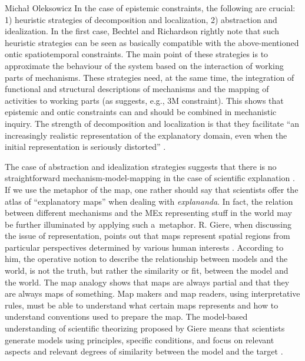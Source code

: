 \begin{artengenv}{Michał Oleksowicz}
In the case of epistemic constraints, the following are crucial: 1) heuristic strategies of decomposition and localization, 2) abstraction and idealization. In the first case, Bechtel and Richardson
\parencite*[][]{bechtel_discovering_2010} %
 rightly note that such heuristic strategies can be seen as basically compatible with the above-mentioned ontic spatiotemporal constraints. The main point of these strategies is to approximate the behaviour of the system based on the interaction of working parts of mechanisms. These strategies need, at the same time, the integration of functional and structural descriptions of mechanisms and the mapping of activities to working parts (as suggests, e.g., 3M constraint). This shows that epistemic and ontic constraints can and should be combined in mechanistic inquiry. The strength of decomposition and localization is that they facilitate ``an increasingly realistic representation of the explanatory domain, even when the initial representation is seriously distorted'' 
\parencite[][p.8]{bechtel_discovering_2010}.%


The case of abstraction and idealization strategies suggests that there is no straightforward mechanism-model-mapping in the case of scientific explanation
\parencite{parker_model_2020}. %
If we use the metaphor of the map, one rather should say that scientists offer the atlas of ``explanatory maps'' when dealing with \textit{explananda}. In fact, the relation between different mechanisms and the MEx representing stuff in the world may be further illuminated by applying such a~metaphor. R. Giere, when discussing the issue of representation, points out that maps represent spatial regions from particular perspectives determined by various human interests
\parencite[][pp.81–82]{giere_science_1999}. %
According to him, the operative notion to describe the relationship between models and the world, is not the truth, but rather the similarity or fit, between the model and the world. The map analogy shows that maps are always partial and that they are always maps of something. Map makers and map readers, using interpretative rules, must be able to understand what certain maps represents and how to understand conventions used to prepare the map. The model-based understanding of scientific theorizing proposed by Giere means that scientists generate models using principles, specific conditions, and focus on relevant aspects and relevant degrees of similarity between the model and the target
\parencite{giere_how_2004}.


\end{artengenv}
